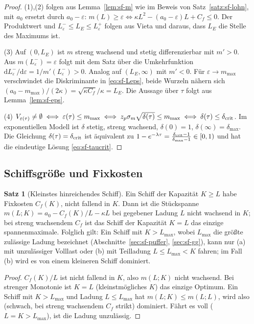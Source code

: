\documentclass[a4paper, 12pt, twoside, openright]{report}
\theoremstyle{definition}
\theoremstyle{definition}
\newtheorem{satz}{Satz}[chapter]
\begin{document}
\begin{proof}
(1),(2) folgen aus Lemma~\ref{lem:sf-m} wie im Beweis von Satz~\ref{satz:sf-lohn},
mit $a_0$ ersetzt durch $a_0-\varepsilon$: $m(L)\ge\varepsilon\iff
\kappa L^2-(a_0-\varepsilon)L+C_f\le0$. Der Produktwert und $L_\varepsilon^-\le
L_E\le L_\varepsilon^+$ folgen aus Vieta und daraus, dass $L_E$ die Stelle des
Maximums ist.

(3) Auf $(0,L_E)$ ist $m$ streng wachsend und stetig differenzierbar mit $m'>0$.
Aus $m(L_\varepsilon^-)=\varepsilon$ folgt mit dem Satz über die Umkehrfunktion
$\mathrm{d}L_\varepsilon^-/\mathrm{d}\varepsilon=1/m'(L_\varepsilon^-)>0$. Analog auf
$(L_E,\infty)$ mit $m'<0$. Für $\varepsilon\to m_{\max}$ verschwindet die
Diskriminante in \eqref{eq:sf-Leps}, beide Wurzeln nähern sich
$(a_0-m_{\max})/(2\kappa)=\sqrt{\kappa C_f}/\kappa=L_E$. Die Aussage über $\tau$
folgt aus Lemma~\ref{lem:sf-eps}.

(4) $V_{\varepsilon(\tau)}\neq\emptyset\iff\varepsilon(\tau)\le m_{\max}\iff
z_p\sigma_m\sqrt{\delta(\tau)}\le m_{\max}\iff\delta(\tau)\le\delta_{\rm crit}$.
Im exponentiellen Modell ist $\delta$ stetig, streng wachsend, $\delta(0)=1$,
$\delta(\infty)=\delta_{\max}$. Die Gleichung
$\delta(\tau)=\delta_{\rm crit}$ ist äquivalent zu
$1-e^{-\lambda\tau}=\frac{\delta_{\rm crit}-1}{\delta_{\max}-1}\in[0,1)$ und hat die
eindeutige Lösung \eqref{eq:sf-taucrit}.
\end{proof}

\subsection{Schiffsgröße und Fixkosten}

\begin{satz}[Kleinstes hinreichendes Schiff]\label{satz:sf-schiff}
Ein Schiff der Kapazität $K\ge L$ habe Fixkosten $C_f(K)$, nicht fallend in $K$.
Dann ist die Stückspanne $m(L;K)=a_0-C_f(K)/L-\kappa L$ bei gegebener Ladung $L$
nicht wachsend in $K$; bei streng wachsendem $C_f$ ist das Schiff der Kapazität
$K=L$ das einzige spannenmaximale. Folglich gilt: Ein Schiff mit
$K>L_{\max}$, wobei $L_{\max}$ die größte zulässige Ladung bezeichnet
(Abschnitte~\ref{sec:sf-puffer}, \ref{sec:sf-gg}), kann nur (a) mit
unzulässiger Volllast oder (b) mit Teilladung $L\le L_{\max}<K$ fahren; im Fall (b)
wird es von einem kleineren Schiff dominiert.
\end{satz}

\begin{proof}
$C_f(K)/L$ ist nicht fallend in $K$, also $m(L;K)$ nicht wachsend. Bei strenger
Monotonie ist $K=L$ (kleinstmögliches $K$) das einzige Optimum. Ein Schiff mit
$K>L_{\max}$ und Ladung $L\le L_{\max}$ hat $m(L;K)\le m(L;L)$, wird also
(schwach, bei streng wachsendem $C_f$ strikt) dominiert. Fährt es voll ($L=K>L_{\max}$),
ist die Ladung unzulässig.
\end{proof}
\end{document}
